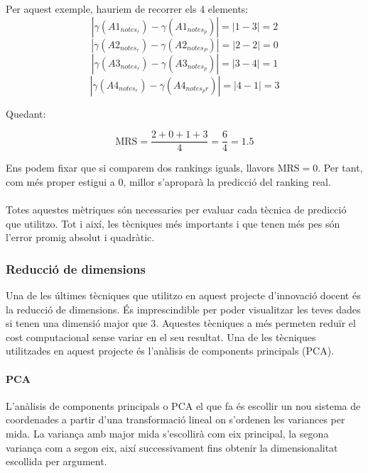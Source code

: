 \documentclass[12pt,a4paper,catalan]{article}
\begin{document}
Per aquest exemple, hauriem de recorrer els 4 elements:
	$$\left|\gamma(A1_{notes_r}) - \gamma(A1_{notes_p})\right| = \left| 1 - 3 \right| = 2$$
	$$\left|\gamma(A2_{notes_r}) - \gamma(A2_{notes_P})\right| = \left| 2 - 2 \right| = 0$$
	$$\left|\gamma(A3_{notes_r}) - \gamma(A3_{notes_p})\right| = \left| 3 - 4 \right| = 1$$
	$$\left|\gamma(A4_{notes_r}) - \gamma(A4_{notes_pr})\right| = \left| 4 - 1 \right| = 3$$

Quedant:

$$ \mathrm{MRS} = \frac{2 + 0 + 1 + 3}{4} = \frac{6}{4} = 1.5$$

Ens podem fixar que si comparem dos rankings iguals, llavors $\mathrm{MRS} = 0$. Per tant, com més proper estigui a 0, millor s'aproparà la predicció del ranking real.
\\
\\
Totes aquestes mètriques són necessaries per evaluar cada tècnica de predicció que utilitzo. Tot i així, les tècniques més importants i que tenen més pes són l'error promig absolut i quadràtic.

\subsubsection{Reducció de dimensions}
Una de les últimes tècniques que utilitzo en aquest projecte d'innovació docent és la reducció de dimensions. És imprescindible per poder visualitzar les teves dades si tenen una dimensió major que 3. Aquestes tècniques a més permeten reduïr el cost computacional sense variar en el seu resultat. Una de les tècniques utilitzades en aquest projecte és l'anàlisis de components principals (PCA).

\paragraph{PCA}
L'anàlisis de components principals o PCA el que fa és escollir un nou sistema de coordenades a partir d'una transformació lineal on s'ordenen les variances per mida. La variança amb major mida s'escollirà com eix principal, la segona variança com a segon eix, així successivament fins obtenir la dimensionalitat escollida per argument.


\newpage
\end{document}
